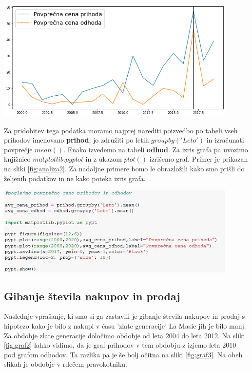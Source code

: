 \documentclass[a4paper, 12pt]{article}
\begin{document}
\begin{center}
\includegraphics[width=0.9\textwidth]{graf1}
\label{fig:graf1}
\end{center}

Za pridobitev tega podatka moramo najprej narediti poizvedbo po tabeli vseh prihodov imenovano \textbf{prihod}, jo združiti po letih $groupby('Leto')$ in izračunati povprečje $mean()$. Enako izvedemo na tabeli \textbf{odhod}. 
Za izris grafa pa uvozimo knjižnico $matplotlib.pyplot$ in z ukazom $plot()$ izrišemo graf. Primer je prikazan na sliki \ref{fig:analiza2}. Za nadaljne primere bomo le obrazložili kako smo prišli do željenih podatkov in ne kako poteka izris grafa.

\begin{center}
\includegraphics[width=0.9\textwidth]{analiza2}
\label{fig:analiza2}
\end{center} \medskip

\subsection{Gibanje števila nakupov in prodaj}
Naslednje vprašanje, ki smo si ga zastavili je gibanje števila nakupov in prodaj s hipotezo kako je bilo z nakupi v času 'zlate generacije' La Masie jih je bilo manj. Za obdobje zlate generacije določimo obdobje od leta 2004 do leta 2012. Na sliki \ref{fig:graf2} lahko vidimo, da je graf prihodov v tem obdobju z izjemo leta 2010 pod grafom odhodov. Ta razlika pa je še bolj očitna na sliki \ref{fig:graf3}. Na obeh slikah je obdobje v rdečem pravokotniku.
\end{document}
